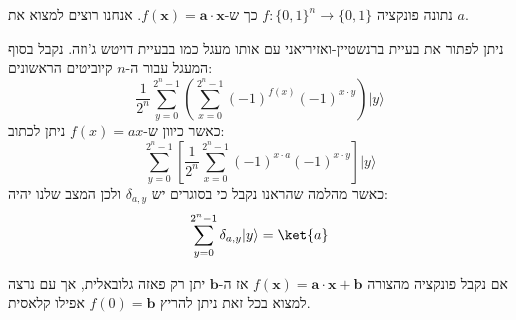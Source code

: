 \documentclass{tstextbook}
\begin{document}
\begin{definition}
נתונה פונקציה \(f:\{ 0,1 \}^{n}\to\{ 0,1 \}\) כך ש-\(f\left( \mathbf{x} \right)=\mathbf{a}\cdot \mathbf{x}\). אנחנו רוצים למצוא את \(a\).

\end{definition}
\begin{proposition}
ניתן לפתור את בעיית ברנשטיין-ואזיריאני עם אותו מעגל כמו בבעיית דויטש ג'וזה. נקבל בסוף המעגל עבור ה-\(n\) קיוביטים הראשונים:
$${\frac{1}{2^{n}}}\sum_{y=0}^{2^{n}-1}{ \left(\sum_{x=0}^{2^{n}-1}(-1)^{f(x)}(-1)^{x\cdot y}\right) }|y\rangle$$
כאשר כיוון ש-\(f(x)=ax\) ניתן לכתוב:
$$\sum_{y=0}^{2^{n}-1}\left[{\frac{1}{2^{n}}}\sum_{x=0}^{2^{n}-1}\left(-1\right)^{x\cdot a}\left(-1\right)^{x\cdot y}\right]|y\rangle$$
כאשר מהלמה שהראנו נקבל כי בסוגרים יש \(\delta_{a,y}\) ולכן המצב שלנו יהיה:
$$\sum_{y=0}^{2^{n}-1}\delta_{a,y}|y\rangle=\ket{a} $$

\end{proposition}
\begin{remark}
אם נקבל פונקציה מהצורה \(f\left( \mathbf{x} \right)=\mathbf{a}\cdot \mathbf{x}+\mathbf{b}\) אז ה-\(\mathbf{b}\) יתן רק פאזה גלובאלית, אך עם נרצה למצוא בכל זאת ניתן להריץ \(f(0)=\mathbf{b}\) אפילו קלאסית.

\end{remark}
\end{document}
